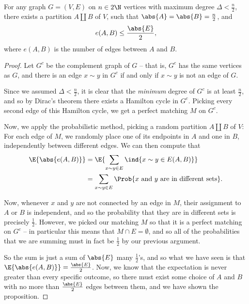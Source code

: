 \documentclass[nobib]{tufte-handout}
\begin{document}
\begin{proposition}
  For any graph $G = (V,E)$ on $n \in 2\N$ vertices with maximum degree $\Delta < \frac{n}{2}$, there exists a partition $A \coprod B$ of $V$, such that $\abs{A} = \abs{B} = \frac{n}{2}$, and
  $$e(A,B) \leq \frac{\abs{E}}{2},$$
  where $e(A,B)$ is the number of edges between $A$ and $B$.

  \begin{proof}
    Let $G^c$ be the complement graph of $G$ -- that is, $G^c$ has the same vertices as $G$, and there is an edge $x \sim y$ in $G^c$ if and only if $x \sim y$ is not an edge of $G$.

    Since we assumed $\Delta < \frac{n}{2}$, it is clear that the \emph{minimum} degree of $G^c$ is at least $\frac{n}{2}$, and so by Dirac's theorem there exists a Hamilton cycle in $G^c$. Picking every second edge of this Hamilton cycle, we get a perfect matching $M$ on $G^c$.

    Now, we apply the probabilistic method, picking a random partition $A \coprod B$ of $V$: For each edge of $M$, we randomly place one of its endpoints in $A$ and one in $B$, independently between different edges. We can then compute that
    \begin{align*}
      \E{\abs{e(A,B)}} &= \E{\sum_{x \sim y \in E} \ind{x \sim y \in E(A,B)}}\\
      &= \sum_{x \sim y \in E} \Prob{x\text{ and }y\text{ are in different sets}}.
    \end{align*}

    Now, whenever $x$ and $y$ are not connected by an edge in $M$, their assignment to $A$ or $B$ is independent, and so the probability that they are in different sets is precisely $\frac{1}{2}$. However, we picked our matching $M$ so that it is a perfect matching on $G^c$ -- in particular this means that $M \cap E = \emptyset$, and so all of the probabilities that we are summing must in fact be $\frac{1}{2}$ by our previous argument.

    So the sum is just a sum of $\abs{E}$ many $\frac{1}{2}$'s, and so what we have seen is that $\E{\abs{e(A,B)}} = \frac{\abs{E}}{2}$. Now, we know that the expectation is never greater than every specific outcome, so there must exist some choice of $A$ and $B$ with no more than $\frac{\abs{E}}{2}$ edges between them, and we have shown the proposition.
  \end{proof}
\end{proposition}
\end{document}
